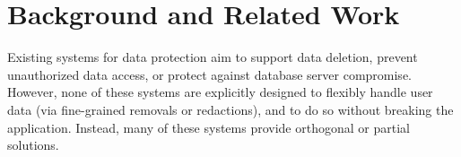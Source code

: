 \section{Background and Related Work}
\let\rwhighlight\relax

\begin{comment}
\begin{figure}[t]
    \centering
    \small
    \begin{tabular}{m{0.23\linewidth}|m{0.19\linewidth}|m{0.19\linewidth}|>{\RaggedRight\arraybackslash}m{0.19\linewidth}} %
        \multirow{2}{*}{\centering\textbf{System}} &
            \multicolumn{3}{c}{\textbf{User $u$'s data is protected against...}}\\
        \cline{2-4}
            & \emph{SQL injection}
            & \emph{Compromised user $\neq u$}
            & \emph{Server compromise} \\
        \hline
        Qapla~\cite{qapla} & \hfil \checkmark & & \\
        \hline
        CryptDB~\cite{cryptdb} & \hfil \checkmark & & \hfil \checkmark \\
    \end{tabular}
    \caption{Threats protected against by different classes of systems.}
    \label{tab:related_threats}
\end{figure}
\end{comment}

%
%
Existing systems for data protection aim to support data deletion, prevent
unauthorized data access, or protect against database server compromise.
%
However, none of these systems are explicitly designed to flexibly handle user
data (via fine-grained removals or redactions), and to do so without breaking
the application. Instead, many of these systems provide orthogonal or partial
solutions.

